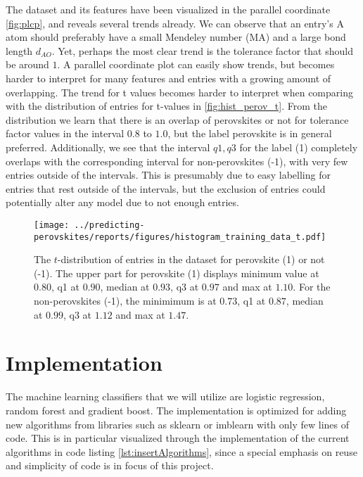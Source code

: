 \noindent The dataset and its features have been visualized in the parallel coordinate \cite{Inselberg1985} \autoref{fig:plcp}, and reveals several trends already. We can observe that an entry's A atom should preferably have a small Mendeley number (MA) and a large bond length $d_{AO}$. Yet, perhaps the most clear trend is the tolerance factor that should be around $1$. A parallel coordinate plot can easily show trends, but becomes harder to interpret for many features and entries with a growing amount of overlapping. The trend for t values becomes harder to interpret when comparing with the distribution of entries for t-values in \autoref{fig:hist_perov_t}. From the distribution we learn that there is an overlap of perovskites or not for tolerance factor values in the interval $0.8$ to $1.0$, but the label perovskite is in general preferred. Additionally, we see that the interval ${q1,q3}$ for the label (1) completely overlaps with the corresponding interval for non-perovskites (-1), with very few entries outside of the intervals. This is presumably due to easy labelling for entries that rest outside of the intervals, but the exclusion of entries could potentially alter any model due to not enough entries. %

\begin{figure}[ht!]
  \centering
  \texttt{[image: ../predicting-perovskites/reports/figures/histogram\_training\_data\_t.pdf]}
  \vspace*{-130mm}
  \caption{The $t$-distribution of entries in the dataset for perovskite (1) or not (-1). The upper part for perovskite (1) displays minimum value at $0.80$, q1 at $0.90$, median at $0.93$, q3 at $0.97$ and max at $1.10$. For the non-perovskites (-1), the minimimum is at $0.73$, q1 at $0.87$, median at $0.99$, q3 at $1.12$ and max at $1.47$.}
  \label{fig:hist_perov_t}
\end{figure}

\section{Implementation}

The machine learning classifiers that we will utilize are logistic regression, random forest and gradient boost. The implementation is optimized for adding new algorithms from libraries such as sklearn \cite{Pedregosa2012} or imblearn \cite{Lemaitre2016} with only few lines of code. This is in particular visualized through the implementation of the current algorithms in code listing \autoref{lst:insertAlgorithms}, since a special emphasis on reuse and simplicity of code is in focus of this project.

